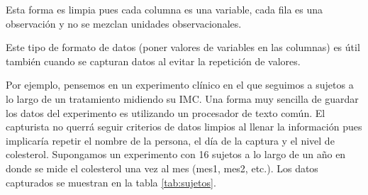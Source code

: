 \documentclass[]{article}
\begin{document}
\begin{nota}[Nota] 
Esta forma es limpia pues cada columna es una variable, cada fila es una observación
y no se mezclan unidades observacionales.
\end{nota}

Este tipo de formato de datos (poner valores de variables en las
columnas) es útil también cuando se capturan datos al evitar la
repetición de valores.

Por ejemplo, pensemos en un experimento clínico en el que seguimos a
sujetos a lo largo de un tratamiento midiendo su IMC. Una forma muy
sencilla de guardar los datos del experimento es utilizando un
procesador de texto común. El capturista no querrá seguir criterios de
datos limpios al llenar la información pues implicaría repetir el nombre
de la persona, el día de la captura y el nivel de colesterol. Supongamos
un experimento con 16 sujetos a lo largo de un año en donde se mide el
colesterol una vez al mes (mes1, mes2, etc.). Los datos capturados se
muestran en la tabla \ref{tab:sujetos}.
\end{document}
